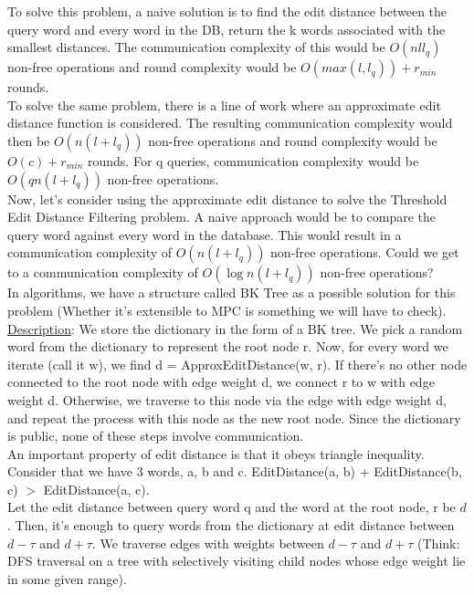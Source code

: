 To solve this problem, a naive solution is to find the edit distance between the query word and every word in the DB, return the k words associated with the smallest distances. The communication complexity of this would be $O(nll_q)$ non-free operations and round complexity would be $O(max(l, l_q)) + r_{min}$ rounds.\\

To solve the same problem, there is a line of work where an approximate edit distance function is considered. The resulting communication complexity would then be $O(n(l + l_q))$ non-free operations and round complexity would be $O(c) + r_{min}$ rounds. For q queries, communication complexity would be $O(qn(l + l_q))$ non-free operations.\\

Now, let's consider using the approximate edit distance to solve the Threshold Edit Distance Filtering problem. A naive approach would be to compare the query word against every word in the database. This would result in a communication complexity of $O(n(l + l_q))$ non-free operations. Could we get to a communication complexity of $O(\log n(l + l_q))$ non-free operations? \\

In algorithms, we have a structure called BK Tree as a possible solution for this problem (Whether it's extensible to MPC is something we will have to check).\\

\underline{Description}: We store the dictionary in the form of a BK tree. We pick a random word from the dictionary to represent the root node r. Now, for every word we iterate (call it w), we find d = ApproxEditDistance(w, r). If there's no other node connected to the root node with edge weight d, we connect r to w with edge weight d. Otherwise, we traverse to this node via the edge with edge weight d, and repeat the process with this node as the new root node. Since the dictionary is public, none of these steps involve communication.\\

An important property of edit distance is that it obeys triangle inequality. Consider that we have 3 words, a, b and c. EditDistance(a, b) + EditDistance(b, c) $>$ EditDistance(a, c).\\

Let the edit distance between query word q and the word at the root node, r be $d$. Then, it's enough to query words from the dictionary at edit distance between $d - \tau$ and $d + \tau$. We traverse edges with weights between $d - \tau$ and $d + \tau$ (Think: DFS traversal on a tree with selectively visiting child nodes whose edge weight lie in some given range).





%
